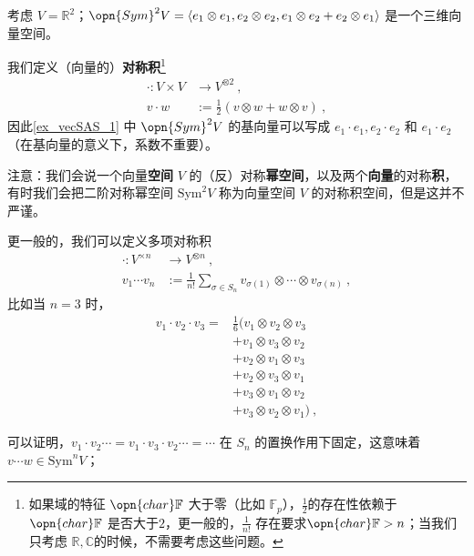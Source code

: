 \begin{example}{}\label{ex_vecSAS_1}
考虑 $V = \mathbb{R}^2$；$\opn{Sym}^2 V = \langle e_1 \otimes e_1, e_2 \otimes e_2, e_1 \otimes e_2 + e_2 \otimes e_1 \rangle$ 是一个三维向量空间。
\end{example}

我们定义（向量的）\textbf{对称积}\footnote{如果域的特征 $\opn{char} \mathbb{F}$ 大于零（比如 $\mathbb{F}_p$），$\frac{1}{2}$的存在性依赖于 $\opn{char} \mathbb{F}$ 是否大于$2$，更一般的，$\frac{1}{n!}$ 存在要求$\opn{char} \mathbb{F} > n$；当我们只考虑 $\mathbb{R}, \mathbb{C}$的时候，不需要考虑这些问题。}
\begin{equation}
\begin{aligned}
\cdot: V \times V &\to V^{\otimes 2}~, \\
v \cdot w &:= \frac12 (v \otimes w + w \otimes v)~,
\end{aligned}
\end{equation}
因此\autoref{ex_vecSAS_1} 中 $\opn{Sym}^2 V$ 的基向量可以写成 $e_1 \cdot e_1, e_2 \cdot e_2$ 和 $e_1 \cdot e_2$ （在基向量的意义下，系数不重要）。

注意：我们会说一个向量\textbf{空间} $V$ 的（反）对称\textbf{幂空间}，以及两个\textbf{向量}的对称\textbf{积}，有时我们会把二阶对称幂空间 $\text{Sym}^2 V$ 称为向量空间 $V$ 的对称积空间，但是这并不严谨。

更一般的，我们可以定义多项对称积
\begin{equation}
\begin{aligned}
\cdot: V^{\times n} &\to V^{\otimes n}~, \\
v_1 \cdots v_n &:= \frac{1}{n!} \sum_{\sigma \in S_n} v_{\sigma(1)} \otimes \cdots \otimes v_{\sigma(n)}~,
\end{aligned}
\end{equation}
比如当 $n = 3$ 时，
\begin{equation}
\begin{aligned}
v_1 \cdot v_2 \cdot v_3 = &\frac16 (v_1 \otimes v_2 \otimes v_3 \\
&+ v_1 \otimes v_3 \otimes v_2 \\
&+ v_2 \otimes v_1 \otimes v_3 \\
&+ v_2 \otimes v_3 \otimes v_1 \\
&+ v_3 \otimes v_1 \otimes v_2 \\
&+ v_3 \otimes v_2 \otimes v_1)~,
\end{aligned}
\end{equation}

可以证明，$v_1 \cdot v_2 \cdots = v_1 \cdot v_3 \cdot v_2 \cdots = \cdots$ 在 $S_n$ 的置换作用下固定，这意味着$v \cdots w \in \text{Sym}^n V$；

